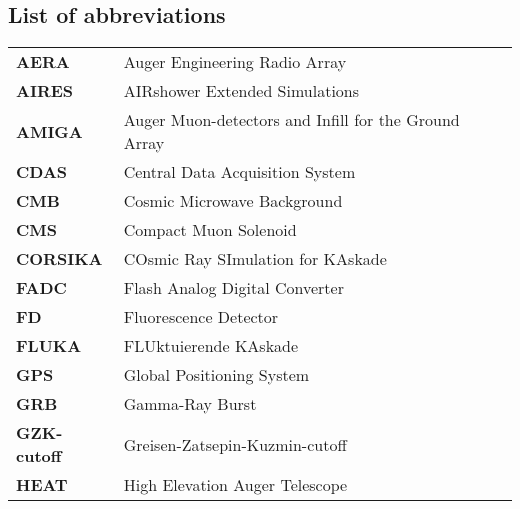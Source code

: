 \chapter{\appendixname}


\section{List of abbreviations}

\vspace{1cm} 

  \begin{tabular}{ll}

\textbf{AERA} & \hspace{1cm}Auger Engineering Radio Array\\
\textbf{AIRES}& \hspace{1cm}AIRshower Extended Simulations\\
\textbf{AMIGA} & \hspace{1cm}Auger Muon-detectors and Infill for the Ground Array  \\
\textbf{CDAS} &\hspace{1cm}Central Data Acquisition System \\
\textbf{CMB} & \hspace{1cm}Cosmic Microwave Background\\
\textbf{CMS} & \hspace{1cm}Compact Muon Solenoid\\
\textbf{CORSIKA} & \hspace{1cm}COsmic Ray SImulation for KAskade\\
\textbf{FADC} &\hspace{1cm}Flash Analog Digital Converter \\
\textbf{FD} & \hspace{1cm}Fluorescence Detector \\
\textbf{FLUKA} & \hspace{1cm}FLUktuierende KAskade\\
\textbf{GPS} & \hspace{1cm}Global Positioning System \\
\textbf{GRB}&\hspace{1cm}Gamma-Ray Burst\\
\textbf{GZK-cutoff} &\hspace{1cm}Greisen-Zatsepin-Kuzmin-cutoff\\
\textbf{HEAT} &\hspace{1cm}High Elevation Auger Telescope\\

\end{tabular}
